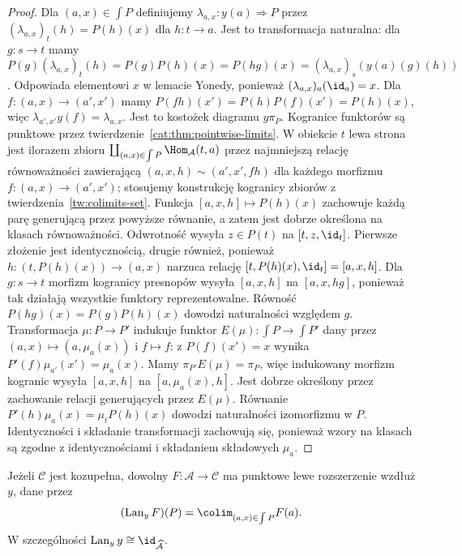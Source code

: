 \begin{proof}
Dla $(a,x)\in\int P$ definiujemy $\lambda_{a,x}:y(a)\Rightarrow P$ przez $(\lambda_{a,x})_t(h)=P(h)(x)$ dla $h:t\to a$. Jest to transformacja naturalna: dla $g:s\to t$ mamy $P(g)(\lambda_{a,x})_t(h)=P(g)P(h)(x)=P(hg)(x)=(\lambda_{a,x})_s(y(a)(g)(h))$. Odpowiada elementowi $x$ w lemacie Yonedy, ponieważ $(\lambda_{a,x})_a(\id_a)=x$. Dla $f:(a,x)\to(a',x')$ mamy $P(fh)(x')=P(h)P(f)(x')=P(h)(x)$, więc $\lambda_{a',x'}y(f)=\lambda_{a,x}$. Jest to kostożek diagramu $y\pi_P$. Kogranice funktorów są punktowe przez twierdzenie~\ref{cat:thm:pointwise-limits}. W obiekcie $t$ lewa strona jest ilorazem zbioru $\coprod_{(a,x)\in\int P}\Hom_{\mathcal A}(t,a)$ przez najmniejszą relację równoważności zawierającą $(a,x,h)\sim(a',x',fh)$ dla każdego morfizmu $f:(a,x)\to(a',x')$; stosujemy konstrukcję kogranicy zbiorów z twierdzenia~\ref{tw:colimits-set}. Funkcja $[a,x,h]\mapsto P(h)(x)$ zachowuje każdą parę generującą przez powyższe równanie, a zatem jest dobrze określona na klasach równoważności. Odwrotność wysyła $z\in P(t)$ na $[t,z,\id_t]$. Pierwsze złożenie jest identycznością, drugie również, ponieważ $h:(t,P(h)(x))\to(a,x)$ narzuca relację $[t,P(h)(x),\id_t]=[a,x,h]$. Dla $g:s\to t$ morfizm kogranicy presnopów wysyła $[a,x,h]$ na $[a,x,hg]$, ponieważ tak działają wszystkie funktory reprezentowalne. Równość $P(hg)(x)=P(g)P(h)(x)$ dowodzi naturalności względem $g$. Transformacja $\mu:P\to P'$ indukuje funktor $E(\mu):\int P\to\int P'$ dany przez $(a,x)\mapsto(a,\mu_a(x))$ i $f\mapsto f$: z $P(f)(x')=x$ wynika $P'(f)\mu_{a'}(x')=\mu_a(x)$. Mamy $\pi_{P'}E(\mu)=\pi_P$, więc indukowany morfizm kogranic wysyła $[a,x,h]$ na $[a,\mu_a(x),h]$. Jest dobrze określony przez zachowanie relacji generujących przez $E(\mu)$. Równanie $P'(h)\mu_a(x)=\mu_tP(h)(x)$ dowodzi naturalności izomorfizmu w $P$. Identyczności i składanie transformacji zachowują się, ponieważ wzory na klasach są zgodne z identycznościami i składaniem składowych $\mu_a$.
\end{proof}
\begin{wniosek}\label{cat:cor:kan-yoneda-extension}
Jeżeli $\mathcal C$ jest kozupełna, dowolny $F:\mathcal A\to\mathcal C$ ma punktowe lewe rozszerzenie wzdłuż $y$, dane przez
\[
 (\operatorname{Lan}_y F)(P)=\colim_{(a,x)\in\int P}F(a).
\]
W szczególności $\operatorname{Lan}_y y\cong\id_{\widehat{\mathcal A}}$.
\end{wniosek}
